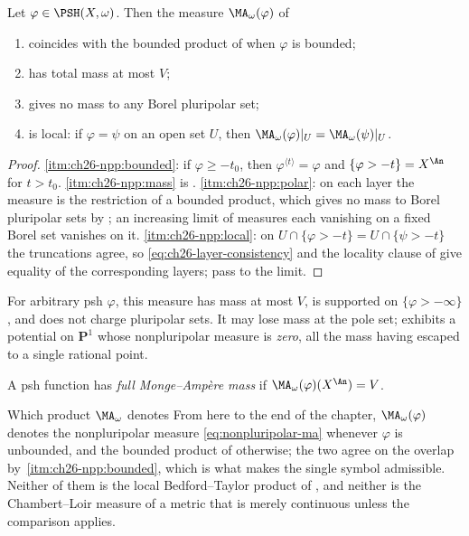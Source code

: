 \begin{proposition}
\label{prop:ch26-npp-basic}
Let \(\varphi\in\PSH(X,\omega)\).  Then the measure
\(\MA_\omega(\varphi)\) of 
\begin{enumerate}
\item\label{itm:ch26-npp:bounded}
 coincides with the bounded product of  when
 \(\varphi\) is bounded;
\item\label{itm:ch26-npp:mass}
 has total mass at most \(V\);
\item\label{itm:ch26-npp:polar}
 gives no mass to any Borel pluripolar set;
\item\label{itm:ch26-npp:local}
 is local: if \(\varphi=\psi\) on an open set \(U\), then
 \(\MA_\omega(\varphi)|_U=\MA_\omega(\psi)|_U\).
\end{enumerate}
\end{proposition}

\begin{proof}
\cref{itm:ch26-npp:bounded}: if \(\varphi\geq-t_0\), then
\(\varphi^{\langle t\rangle}=\varphi\) and \(\{\varphi>-t\}=X^{\An}\) for
\(t>t_0\).  \cref{itm:ch26-npp:mass} is .
\cref{itm:ch26-npp:polar}: on each layer the measure is the restriction of a
bounded product, which gives no mass to Borel pluripolar sets by
; an increasing limit of measures each
vanishing on a fixed Borel set vanishes on it.
\cref{itm:ch26-npp:local}: on \(U\cap\{\varphi>-t\}=U\cap\{\psi>-t\}\) the
truncations agree, so \eqref{eq:ch26-layer-consistency} and the locality
clause of  give equality of the
corresponding layers; pass to the limit.
\end{proof}

For arbitrary psh \(\varphi\), this measure has mass at most \(V\), is
supported on \(\{\varphi>-\infty\}\), and does not charge pluripolar sets.
It may lose mass at the pole set;
 exhibits a potential on \(\mathbf P^1\) whose
nonpluripolar measure is \emph{zero}, all the mass having escaped to a single
rational point.

\begin{definition}
A psh function has \emph{full Monge--Amp\`ere mass} if
\(\MA_\omega(\varphi)(X^{\An})=V\).
\end{definition}

\begin{warning}{Which product \(\MA_\omega\) denotes}
From here to the end of the chapter, \(\MA_\omega(\varphi)\) denotes the
nonpluripolar measure \eqref{eq:nonpluripolar-ma} whenever \(\varphi\) is
unbounded, and the bounded product of 
otherwise; the two agree on the overlap by
\,\cref{itm:ch26-npp:bounded}, which is what makes
the single symbol admissible.  Neither of them is the local
Bedford--Taylor product of , and neither is
the Chambert--Loir measure of a metric that is merely continuous unless the
comparison  applies.
\end{warning}

